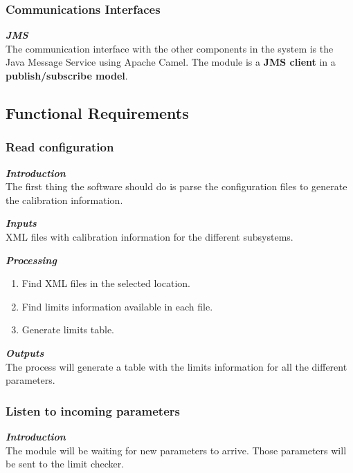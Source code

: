 \subsubsection{Communications Interfaces}

\textbf{\emph{JMS}}\cite{JMS}\\
The communication interface with the other components in the system is the Java Message Service using Apache Camel. The module is a \textbf{JMS client} in a \textbf{publish/subscribe model}.

\subsection{Functional Requirements}

\subsubsection{Read configuration}

\textbf{\emph{Introduction}}\\
The first thing the software should do is parse the configuration files to generate the calibration information.

\textbf{\emph{Inputs}}\\

XML files with calibration information for the different subsystems.

\textbf{\emph{Processing}}\\
\begin{enumerate}
\item Find XML files in the selected location.
\item Find limits information available in each file.
\item Generate limits table.
\end{enumerate}

\textbf{\emph{Outputs}}\\

The process will generate a table with the limits information for all the different parameters.



\subsubsection{Listen to incoming parameters}

\textbf{\emph{Introduction}}\\
The module will be waiting for new parameters to arrive. Those parameters will be sent to the limit checker.

